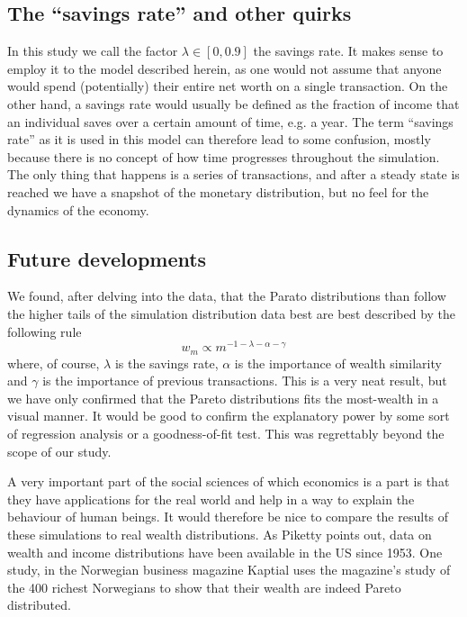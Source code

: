 \documentclass[10pt, a4paper]{amsart}
\begin{document}
\subsection{The ``savings rate'' and other quirks}
In this study we call the factor $\lambda \in [0,0.9]$ the savings rate. It makes sense to employ it to the model described herein, as one would not assume that anyone would spend (potentially) their entire net worth on a single transaction. On the other hand, a savings rate would usually be defined as the fraction of income that an individual saves over a certain amount of time, e.g. a year. The term ``savings rate'' as it is used in this model can therefore lead to some confusion, mostly because there is no concept of how time progresses throughout the simulation. The only thing that happens is a series of transactions, and after a steady state is reached we have a snapshot of the monetary distribution, but no feel for the dynamics of the economy.

\subsection{Future developments}

We found, after delving into the data, that the Parato distributions than follow the higher tails of the simulation distribution data best are best described by the following rule
\begin{equation}
\label{eq:ourpareto}
w_m \propto m^{-1-\lambda-\alpha-\gamma}
\end{equation}
where, of course, $\lambda$ is the savings rate, $\alpha$ is the importance of wealth similarity and $\gamma$ is the importance of previous transactions. This is a very neat result, but we have only confirmed that the Pareto distributions fits the most-wealth in a visual manner. It would be good to confirm the explanatory power by some sort of regression analysis or a goodness-of-fit test. This was regrettably beyond the scope of our study.

A very important part of the social sciences of which economics is a part is that they have applications for the real world and help in a way to explain the behaviour of human beings. It would therefore be nice to compare the results of these simulations to real wealth distributions. As Piketty points out\cite{Piketty}, data on wealth and income distributions have been available in the US since 1953. One study\cite{Kjersti}, in the Norwegian business magazine Kaptial uses the magazine's study of the 400 richest Norwegians to show that their wealth are indeed Pareto distributed. 
\end{document}
